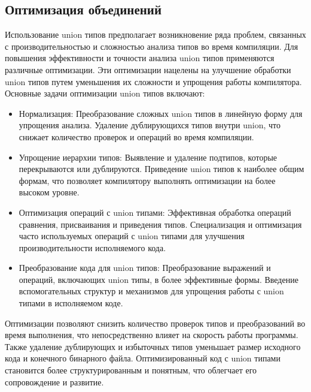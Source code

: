 \subsection{Оптимизация объединений}

Использование union типов предполагает возникновение ряда проблем, связанных с производительностью и сложностью анализа
типов во время компиляции.
Для повышения эффективности и точности анализа union типов применяются различные оптимизации.
Эти оптимизации нацелены на улучшение обработки union типов путем уменьшения их сложности и упрощения работы компилятора.
Основные задачи оптимизации union типов включают:

\begin{itemize}[left=2em]
    \item Нормализация:
    Преобразование сложных union типов в линейную форму для упрощения анализа.
    Удаление дублирующихся типов внутри union, что снижает количество проверок и операций во время компиляции.

    \item Упрощение иерархии типов:
    Выявление и удаление подтипов, которые перекрываются или дублируются.
    Приведение union типов к наиболее общим формам, что позволяет компилятору выполнять оптимизации на более высоком уровне.

    \item Оптимизация операций с union типами:
    Эффективная обработка операций сравнения, присваивания и приведения типов.
    Специализация и оптимизация часто используемых операций с union типами для улучшения производительности исполняемого кода.

    \item Преобразование кода для union типов:
    Преобразование выражений и операций, включающих union типы, в более эффективные формы.
    Введение вспомогательных структур и механизмов для упрощения работы с union типами в исполняемом коде.
\end{itemize}

Оптимизации позволяют снизить количество проверок типов и преобразований во время выполнения, что непосредственно
влияет на скорость работы программы.
Также удаление дублирующих и избыточных типов уменьшает размер исходного кода и конечного бинарного файла.
Оптимизированный код с union типами становится более структурированным и понятным, что облегчает его
сопровождение и развитие.

